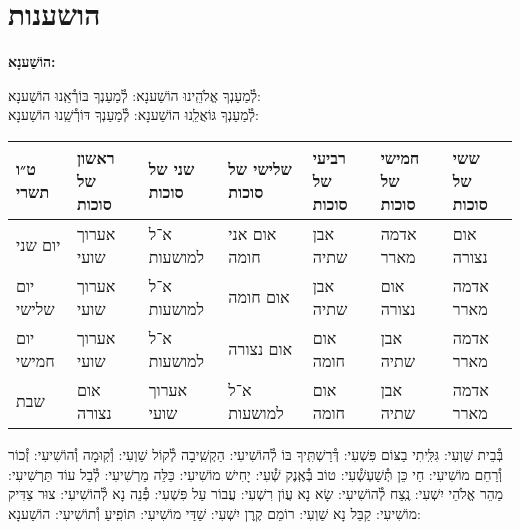 \documentclass[twoside, openany, parskip=half, 11pt]{book}
\begin{document}
\sepline





\chapter[הושענות]{ הושענות }
\label{hoshanos}


\begin{Large}
\textbf{
הוֹשַׁענָא:
}
\end{Large}


לְ֯מַעַנְךָ אֱלֹהֵֽינוּ הוֹשַׁענָא: לְ֯מַעַנְךָ בּוֹרְ֯אֵֽנוּ הוֹשַׁענָא:\\
לְ֯מַעַנְךָ גּוֹאֲלֵֽנוּ הוֹשַׁענָא: לְ֯מַעַנְךָ דּוֹרְ֯שֵֽׁנוּ הוֹשַׁענָא:

\begin{tiny}
\begin{tabular}{>{\centering\arraybackslash}m{}||>{\centering\arraybackslash}m{}|>{\centering\arraybackslash}m{}|>{\centering\arraybackslash}m{}|>{\centering\arraybackslash}m{}|>{\centering\arraybackslash}m{}|>{\centering\arraybackslash}m{}}
ט״ו תשרי & ראשון של סוכות & שני של סוכות & שלישי של סוכות & רביעי של סוכות & חמישי של סוכות & ששי של סוכות \\
\hline \hline
יום שני & אערוך שועי & א־ל למושעות & אום אני חומה & אבן שתיה & אדמה מארר & אום נצורה\\ \hline
יום שלישי & אערוך שועי & א־ל למושעות & אום חומה & אבן שתיה & אום נצורה & אדמה מארר \\ \hline
יום חמישי & אערוך שועי & א־ל למושעות & אום נצורה & אום חומה & אבן שתיה & אדמה מארר\\ \hline
שבת & אום נצורה & אערוך שועי & א־ל למושעות & אום חומה & אבן שתיה & אדמה מארר
\end{tabular}

\end{tiny}


בְּ֯בֵית שַׁוְעִי: גִּלִּֽיתִי בַצּוֹם פִּשְׁעִי: דְּ֯רַשְׁתִּֽיךָ בּוֹ לְ֯הוֹשִׁיעִי: הַקְשִֽׁיבָה לְ֯קוֹל שַׁוְעִי: וְ֯קֽוּמָה וְ֯הוֹשִׁיעִי: זְ֯כוֹר וְ֯רַחֵם מוֹשִׁיעִי: חַי כֵּן תְּ֯שַׁעְשְׁ֯עִי: טוֹב בְּ֯אֶֽנֶק שְׁ֯עִי: יָחִישׁ מוֹשִׁיעִי: כַּלֵּה מַרְשִׁיעִי: לְ֯בַל עוֹד תַּרְשִׁיעִי: מַהֵר אֱלֹהֵי יִשְׁעִי: נֶֽצַח לְ֯הוֹשִׁיעִי: שָׂא נָא עֲוֹן רִשְׁעִי: עֲבוֹר עַל פִּשְׁעִי: פְּ֯נֵה נָא לְ֯הוֹשִׁיעִי: צוּר צַדִּיק מוֹשִׁיעִי: קַבֵּל נָא שַׁוְעִי: רוֹמֵם קֶֽרֶן יִשְׁעִי:
שַׁדַּי מוֹשִׁיעִי: תּוֹפִֽיעַ וְ֯תוֹשִׁיעִי: הוֹשַׁענָא:

\end{document}
